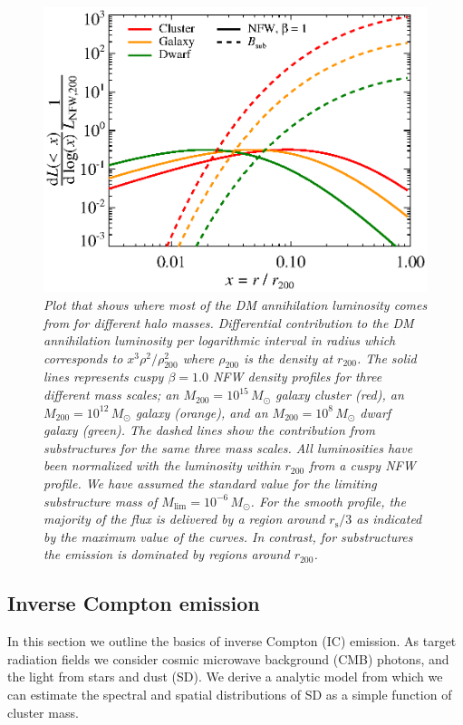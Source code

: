 \documentclass[10pt,aps,pra,reprint,amsmath,amsfonts,amssymb,showpacs,nofootinbib,floatfix]{revtex4-1}
\newcommand{\rmn}{\mathrm}
\newcommand{\msun}{M_\odot}
\newcommand{\s}{\rmn{s}}
\newcommand{\rvir}{r_{200}}
\newcommand{\mvir}{M_{200}}
\begin{document}
\begin{figure}
  \includegraphics[width=0.99\columnwidth]{figures/emissiv.sub.eps}
  \caption{\it Plot that shows where most of the DM annihilation
    luminosity comes from for different halo masses.  Differential
    contribution to the DM annihilation luminosity per logarithmic
    interval in radius which corresponds to $x^3\rho^2/\rho^2_{200}$
    where $\rho_{200}$ is the density at $\rvir$. The solid lines
    represents cuspy $\beta=1.0$ NFW density profiles for three
    different mass scales; an $\mvir=10^{15}\,\msun$ galaxy cluster
    (red), an $\mvir=10^{12}\,\msun$ galaxy (orange), and an
    $\mvir=10^{8}\,\msun$ dwarf galaxy (green). The dashed lines show
    the contribution from substructures for the same three mass
    scales. All luminosities have been normalized with the luminosity
    within $\rvir$ from a cuspy NFW profile. We have assumed the
    standard value for the limiting substructure mass of
    $M_\rmn{lim}=10^{-6}\,\msun$. For the smooth profile, the majority
    of the flux is delivered by a region around $r_\s/3$ as indicated
    by the maximum value of the curves. In contrast, for substructures
    the emission is dominated by regions around $r_{200}$.}
  \label{fig:radial_emis}
\end{figure}


\subsection{Inverse Compton emission}
\label{sect:IC}

In this section we outline the basics of inverse Compton (IC)
emission. As target radiation fields we consider  cosmic microwave
background (CMB) photons, and the light from stars and dust (SD). We
derive a analytic model from which we can estimate the spectral
and spatial distributions of SD as a simple function of cluster mass.
\end{document}
